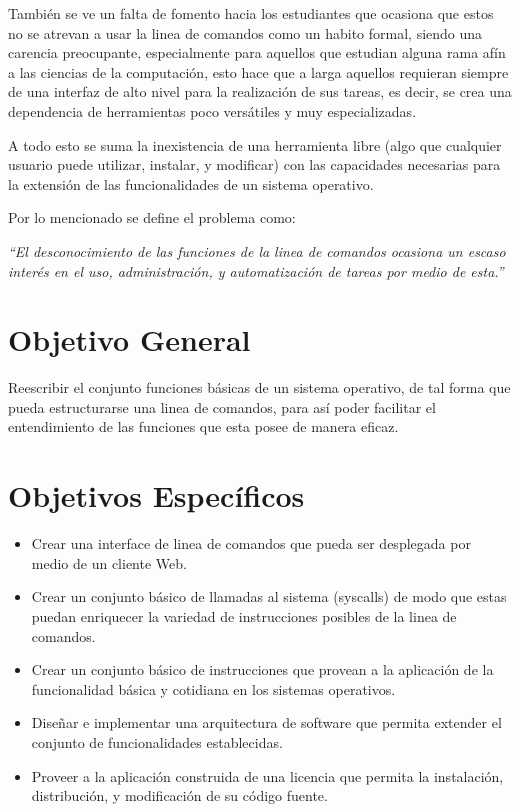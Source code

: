 \documentclass[letterpaper,11pt]{article}
\begin{document}
También se ve un falta de fomento hacia los estudiantes que ocasiona que estos
no se atrevan a usar la linea de comandos como un habito formal, siendo una
carencia preocupante, especialmente para aquellos que estudian alguna rama
afín a las ciencias de la computación, esto hace que a larga aquellos
requieran siempre de una interfaz de alto nivel para la realización de sus
tareas, es decir, se crea una dependencia de herramientas poco versátiles y
muy especializadas.

A todo esto se suma la inexistencia de una herramienta libre (algo que
cualquier usuario puede utilizar, instalar, y modificar) con las capacidades
necesarias para la extensión de las funcionalidades de un sistema operativo.

Por lo mencionado se define el problema como:

\emph{“El desconocimiento de las funciones de la linea de comandos ocasiona un
escaso interés en el uso, administración, y automatización de tareas por medio
de esta.”}

\section{Objetivo General}
Reescribir el conjunto funciones básicas de un sistema operativo, de tal forma
que pueda estructurarse una linea de comandos, para así poder facilitar el
entendimiento de las funciones que esta posee de manera eficaz.

\section{Objetivos Específicos}
\begin{itemize}
\item Crear una interface de linea de comandos que pueda ser desplegada por
medio de un cliente Web.
\item Crear un conjunto básico de llamadas al sistema (syscalls) de modo que
estas puedan enriquecer la variedad de instrucciones posibles de la linea de
comandos.
\item Crear un conjunto básico de instrucciones que provean a la aplicación de
la funcionalidad básica y cotidiana en los sistemas operativos.
\item Diseñar e implementar una arquitectura de software que permita extender
el conjunto de funcionalidades establecidas.
\item Proveer a la aplicación construida de una licencia que permita la
instalación, distribución, y modificación de su código fuente.
\end{itemize}
\end{document}
